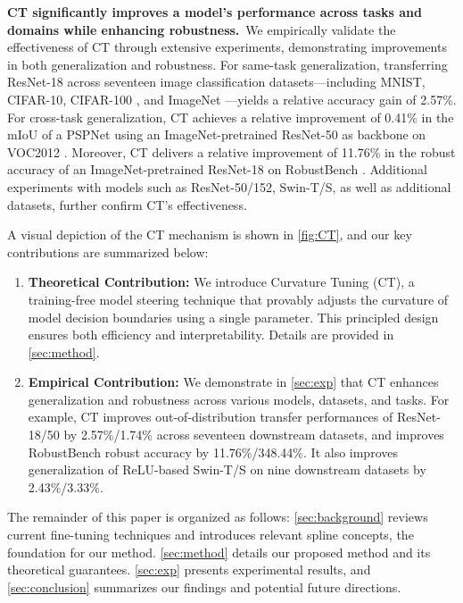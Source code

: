 
{\bf CT significantly improves a model's performance across tasks and domains while enhancing robustness.}~We empirically validate the effectiveness of CT through extensive experiments, demonstrating improvements in both generalization and robustness. For same-task generalization, transferring ResNet-18 \cite{he2016resnet} across seventeen image classification datasets—including MNIST, CIFAR-10, CIFAR-100 \cite{krizhevsky2009learning}, and ImageNet \cite{deng2009imagenet}—yields a relative accuracy gain of 2.57\%. For cross-task generalization, CT achieves a relative improvement of 0.41\% in the mIoU of a PSPNet \cite{zhao2017psp} using an ImageNet-pretrained ResNet-50 as backbone on VOC2012 \cite{everingham2012voc}. Moreover, CT delivers a relative improvement of 11.76\% in the robust accuracy of an ImageNet-pretrained ResNet-18 on RobustBench \cite{croce2020robustbench}. Additional experiments with models such as ResNet-50/152, Swin-T/S, as well as additional datasets, further confirm CT's effectiveness.

A visual depiction of the CT mechanism is shown in \cref{fig:CT}, and our key contributions are summarized below:
\begin{enumerate}
    \item \textbf{Theoretical Contribution:} We introduce Curvature Tuning (CT), a training-free model steering technique that provably adjusts the curvature of model decision boundaries using a single parameter. This principled design ensures both efficiency and interpretability. Details are provided in \cref{sec:method}.
    \item \textbf{Empirical Contribution:} We demonstrate in \cref{sec:exp} that CT enhances generalization and robustness across various models, datasets, and tasks. For example, CT improves out-of-distribution transfer performances of ResNet-18/50 by 2.57\%/1.74\% across seventeen downstream datasets, and improves RobustBench robust accuracy by 11.76\%/348.44\%. It also improves generalization of ReLU-based Swin-T/S on nine downstream datasets by 2.43\%/3.33\%.
\end{enumerate}

The remainder of this paper is organized as follows: \cref{sec:background} reviews current fine-tuning techniques and introduces relevant spline concepts, the foundation for our method. \cref{sec:method} details our proposed method and its theoretical guarantees. \cref{sec:exp} presents experimental results, and \cref{sec:conclusion} summarizes our findings and potential future directions.
